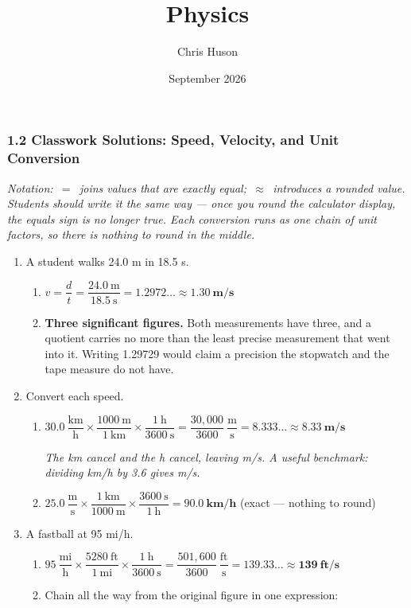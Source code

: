 \documentclass[12pt, twoside]{article}
\title{Physics}
\author{Chris Huson}
\date{September 2026}
\begin{document}
\subsubsection*{1.2 Classwork Solutions: Speed, Velocity, and Unit Conversion}

\emph{Notation: \,$=$\, joins values that are exactly equal; \,$\approx$\, introduces a
rounded value. Students should write it the same way --- once you round the calculator
display, the equals sign is no longer true. Each conversion runs as one chain of unit
factors, so there is nothing to round in the middle.}

\begin{enumerate}[itemsep=0.2cm]

\item A student walks 24.0 m in 18.5 s.
  \begin{enumerate}[itemsep=0.2cm]
    \item $v = \dfrac{d}{t} = \dfrac{24.0~\text{m}}{18.5~\text{s}} = 1.2972\ldots \approx \mathbf{1.30~\textbf{m/s}}$
    \item \textbf{Three significant figures.} Both measurements have three, and a quotient
      carries no more than the least precise measurement that went into it. Writing 1.29729
      would claim a precision the stopwatch and the tape measure do not have.
  \end{enumerate}

\item Convert each speed.
  \begin{enumerate}[itemsep=0.2cm]
    \item $30.0~\dfrac{\text{km}}{\text{h}} \times \dfrac{1000~\text{m}}{1~\text{km}}
      \times \dfrac{1~\text{h}}{3600~\text{s}}
      = \dfrac{30{,}000}{3600}~\dfrac{\text{m}}{\text{s}} = 8.333\ldots
      \approx \mathbf{8.33~\textbf{m/s}}$

      \emph{The km cancel and the h cancel, leaving m/s. A useful benchmark: dividing
      km/h by 3.6 gives m/s.}
    \item $25.0~\dfrac{\text{m}}{\text{s}} \times \dfrac{1~\text{km}}{1000~\text{m}}
      \times \dfrac{3600~\text{s}}{1~\text{h}} = \mathbf{90.0~\textbf{km/h}}$
      \quad (exact --- nothing to round)
  \end{enumerate}

\item A fastball at 95 mi/h.
  \begin{enumerate}[itemsep=0.2cm]
    \item $95~\dfrac{\text{mi}}{\text{h}} \times \dfrac{5280~\text{ft}}{1~\text{mi}}
      \times \dfrac{1~\text{h}}{3600~\text{s}}
      = \dfrac{501{,}600}{3600}~\dfrac{\text{ft}}{\text{s}} = 139.33\ldots
      \approx \mathbf{139~\textbf{ft/s}}$
    \item Chain all the way from the original figure in one expression:


\end{enumerate}
\end{enumerate}
\end{document}
